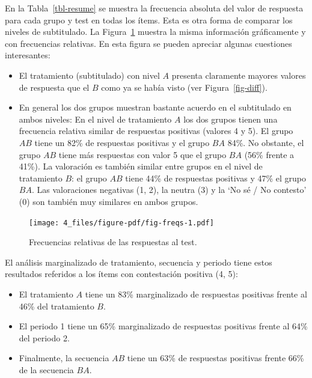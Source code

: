 \documentclass[
  12pt,
  a4paper,
  extrafontsizes,
  onecolumn,
  openright,
  table]{memoir}
\begin{document}
En la Tabla~\ref{tbl-resume} se muestra la frecuencia absoluta del valor
de respuesta para cada grupo y test en todas los ítems. Esta es otra
forma de comparar los niveles de subtitulado. La Figura~\ref{fig-freqs}
muestra la misma información gráficamente y con frecuencias relativas.
En esta figura se pueden apreciar algunas cuestiones interesantes:

\begin{itemize}
\item
  El tratamiento (subtitulado) con nivel \(A\) presenta claramente
  mayores valores de respuesta que el \(B\) como ya se había visto (ver
  Figura~\ref{fig-diff}).
\item
  En general los dos grupos muestran bastante acuerdo en el subtitulado
  en ambos niveles: En el nivel de tratamiento \(A\) los dos grupos
  tienen una frecuencia relativa similar de respuestas positivas
  (valores 4 y 5). El grupo \(AB\) tiene un 82\% de respuestas positivas
  y el grupo \(BA\) 84\%. No obstante, el grupo \(AB\) tiene más
  respuestas con valor 5 que el grupo \(BA\) (56\% frente a 41\%). La
  valoración es también similar entre grupos en el nivel de tratamiento
  \(B\): el grupo \(AB\) tiene 44\% de respuestas positivas y 47\% el
  grupo \(BA\). Las valoraciones negativas (1, 2), la neutra (3) y la
  \enquote*{No sé / No contesto} (0) son también muy similares en ambos
  grupos.
\end{itemize}

\begin{figure}[h]

{\centering \texttt{[image: 4\_files/figure-pdf/fig-freqs-1.pdf]}

}

\caption{\label{fig-freqs}Frecuencias relativas de las respuestas al
test.}

\end{figure}

El análisis marginalizado de tratamiento, secuencia y periodo tiene
estos resultados referidos a los ítems con contestación positiva (4, 5):

\begin{itemize}
\item
  El tratamiento \(A\) tiene un 83\% marginalizado de respuestas
  positivas frente al 46\% del tratamiento \(B\).
\item
  El periodo 1 tiene un 65\% marginalizado de respuestas positivas
  frente al 64\% del periodo 2.
\item
  Finalmente, la secuencia \(AB\) tiene un 63\% de respuestas positivas
  frente 66\% de la secuencia \(BA\).
\end{itemize}
\end{document}
